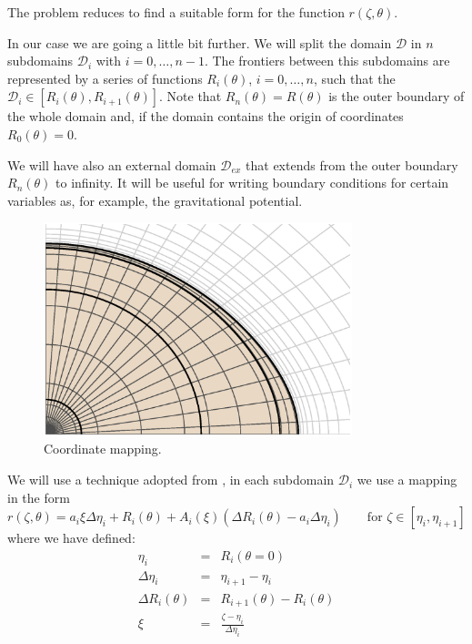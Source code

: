 The problem reduces to find a suitable form for the function $r(\zeta,\theta)$.

In our case we are going a little bit further. We will split the domain $\mathcal{D}$ in $n$ subdomains 
$\mathcal{D}_i$ with $i=0,\ldots,n-1$. The frontiers between this subdomains are represented by a series
of functions $R_i(\theta)$, $i=0,\ldots,n$, such that the $\mathcal{D}_i\in[R_{i}(\theta),R_{i+1}(\theta)]$.
Note that $R_n(\theta)=R(\theta)$ is the outer boundary of the whole domain and, if the domain contains
the origin of coordinates $R_0(\theta)=0$.

We will have also an external domain $\mathcal{D}_{ex}$ that extends from the outer boundary $R_n(\theta)$
to infinity. It will be useful for writing boundary conditions for certain variables as, for example, the
gravitational potential.

\begin{figure}
\centering
\includegraphics[width=0.8\textwidth]{fig/mapping.eps}
\caption{Coordinate mapping.}
\end{figure}


We will use a technique adopted from \citet{Bonazzola}, in each subdomain $\mathcal{D}_i$ we use a mapping
in the form
\begin{equation}
\label{eq:map}
r(\zeta,\theta)=a_i\xi\Delta\eta_i+R_i(\theta)+A_i(\xi)(\Delta R_i(\theta)-a_i\Delta\eta_i) 
\qquad \mbox{for $\zeta\in[\eta_i,\eta_{i+1}]$}
\end{equation}
where we have defined:
\begin{eqnarray*}
\eta_i&=&R_i(\theta=0)\\
\Delta\eta_i&=&\eta_{i+1}-\eta_i\\
\Delta R_i(\theta)&=&R_{i+1}(\theta)-R_{i}(\theta)\\
\xi&=&\displaystyle\frac{\zeta-\eta_i}{\Delta\eta_i}
\end{eqnarray*} 

